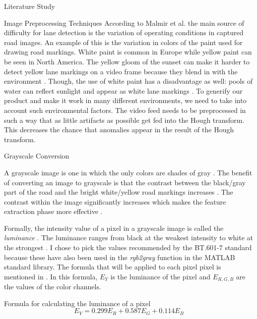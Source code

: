\documentclass{matthijs}
\begin{document}
\begin{hoofdstuk}{Literature Study}
\begin{paragraaf}{Image Preprocessing Techniques}
			According to Malmir et al. \cite{malmir2019design} the main source of difficulty for lane detection is the variation of operating conditions in captured road images.
			An example of this is the variation in colors of the paint used for drawing road markings.
			White paint is common in Europe while yellow paint can be seen in North America.
			The yellow gloom of the sunset can make it harder to detect yellow lane markings on a video frame because they blend in with the environment \cite{tumasov2021research}.
			Though, the use of white paint has a disadvantage as well: pools of water can reflect sunlight and appear as white lane markings \cite{krine2021road}.
			To generify our product and make it work in many different environments, we need to take into account such environmental factors.
			The video feed needs to be preprocessed in such a way that as little artifacts as possible get fed into the Hough transform.
			This decreases the chance that anomalies appear in the result of the Hough transform.
			
			\begin{subparagraaf}{Grayscale Conversion}

				A grayscale image is one in which the only colors are shades of gray \cite{fisher2003hypermedia}.
				The benefit of converting an image to grayscale is that the contrast between the black/gray part of the road and the bright white/yellow road markings increases \cite{tanksale2019finding}.
				The contrast within the image significantly increases which makes the feature extraction phase more effective \cite{ebrahimpour2012vanishing}.

				\bigskip

				Formally, the intensity value of a pixel in a grayscale image is called the \textit{luminance} \cite{itu2017recommendation}.
				The luminance ranges from black at the weakest intensity to white at the strongest \cite{johnson2006stephen}.
				I chose to pick the values recommended by the BT.601-7 standard \cite{itu2017recommendation} because these have also been used in the \textit{rgb2gray} function in the MATLAB standard library.
				The formula that will be applied to each pixel pixel is mentioned in .
				In this formula, $E_Y$ is the luminance of the pixel and $E_{R,G,B}$ are the values of the color channels.

				\begin{figuur}{Formula for calculating the luminance of a pixel}
					\begin{equation*}
						E_Y = 0.299 E_R + 0.587 E_G + 0.114 E_B
					\end{equation*}\cite{itu2017recommendation}
				\end{figuur}
			

\end{subparagraaf}
\end{paragraaf}
\end{hoofdstuk}
\end{document}
